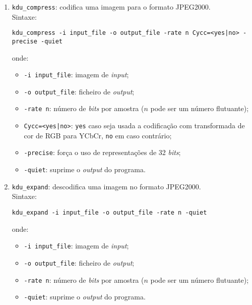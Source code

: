 \begin{enumerate}
    \item \texttt{kdu\_compress}: codifica uma imagem para o formato JPEG2000.\\
    Sintaxe:
    \begin{verbatim}
kdu_compress -i input_file -o output_file -rate n Cycc=<yes|no> -precise -quiet
    \end{verbatim}
    onde:
    \begin{itemize}
        \item \verb|-i input_file|: imagem de \textit{input};
        \item \verb|-o output_file|: ficheiro de \textit{output};
        \item \verb|-rate n|: número de \textit{bits} por amostra ($n$ pode ser um número flutuante);
        \item \verb#Cycc=<yes|no>#: \verb|yes| caso seja usada a codificação com transformada de cor de \ac{RGB} para YCbCr, \verb|no| em caso contrário;
        \item \verb|-precise|: força o uso de representações de 32 \textit{bits};
        \item \verb|-quiet|: suprime o \textit{output} do programa.
    \end{itemize}
    
    \item \texttt{kdu\_expand}: descodifica uma imagem no formato JPEG2000.\\
    Sintaxe:
    \begin{verbatim}
kdu_expand -i input_file -o output_file -rate n -quiet
    \end{verbatim}
    onde:
    \begin{itemize}
        \item \verb|-i input_file|: imagem de \textit{input};
        \item \verb|-o output_file|: ficheiro de \textit{output};
        \item \verb|-rate n|: número de \textit{bits} por amostra ($n$ pode ser um número flutuante);
        \item \verb|-quiet|: suprime o \textit{output} do programa.
    \end{itemize}
\end{enumerate}


